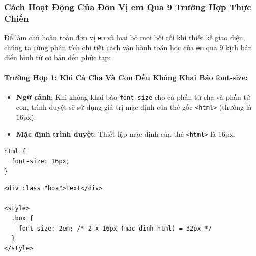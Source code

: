 \documentclass[11pt,oneside]{book}
\newcommand{\codeinline}[1]{\textcolor{accentOrange}{\texttt{#1}}}
\begin{document}
\subsubsection{Cách Hoạt Động Của Đơn Vị em Qua 9 Trường Hợp Thực Chiến}

Để làm chủ hoàn toàn đơn vị \codeinline{em} và loại bỏ mọi bối rối khi thiết kế giao diện, chúng ta cùng phân tích chi tiết cách vận hành toán học của \codeinline{em} qua 9 kịch bản điển hình từ cơ bản đến phức tạp:

\paragraph{Trường Hợp 1: Khi Cả Cha Và Con Đều Không Khai Báo font-size:}
\begin{itemize}[leftmargin=1.5em, itemsep=2pt, parsep=0pt]
    \item \textbf{Ngữ cảnh}: Khi không khai báo \codeinline{font-size} cho cả phần tử cha và phần tử con, trình duyệt sẽ sử dụng giá trị mặc định của thẻ gốc \codeinline{<html>} (thường là $16\text{px}$).
    \item \textbf{Mặc định trình duyệt}: Thiết lập mặc định của thẻ \codeinline{<html>} là $16\text{px}$.
\end{itemize}

\begin{codeWindow}
\begin{lstlisting}[language=CSS3]
html {
  font-size: 16px;
}
\end{lstlisting}
\end{codeWindow}

\begin{codeWindow}
\begin{lstlisting}[language=HTML5]
<div class="box">Text</div>

<style>
  .box {
    font-size: 2em; /* 2 x 16px (mac dinh html) = 32px */
  }
</style>
\end{lstlisting}
\end{codeWindow}
\end{document}
